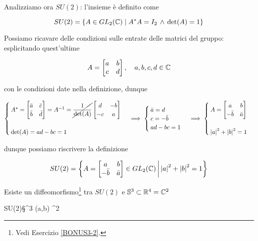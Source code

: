 Analizziamo ora $ SU(2) $: l'insieme è definito come

\begin{equation}
	SU(2) = \{ A \in GL_{2}(\mathbb{C}) \mid A^{*} A = I_{2} \, \wedge \, \det(A) = 1 \}
\end{equation}

Possiamo ricavare delle condizioni sulle entrate delle matrici del gruppo: esplicitando quest'ultime

\begin{equation}
	A = \bmqty{ a & b \\ c & d } \qcomma a,b,c,d \in \C
\end{equation}

con le condizioni date nella definizione, dunque

\begin{equation}
	\begin{cases}
		A^{*} = \bmqty{ \bar{a} & \bar{c} \\ \bar{b} & \bar{d} } %
		= A^{-1} %
		= \cancel{\dfrac{1}{\det(A)}} \bmqty{ d & -b \\ -c & a } \\\\
		\det(A) = a d - b c = 1
	\end{cases}
	\implies %
	\begin{cases}
		\bar{a} = d \\
		c = - \bar{b} \\
		a d - b c = 1
	\end{cases}
	\implies %
	\begin{cases}
		A = \bmqty{ a & b \\ - \bar{b} & \bar{a} } \\\\
		\abs{a}^{2} + \abs{b}^{2} = 1
	\end{cases}
\end{equation}

dunque possiamo riscrivere la definizione

\begin{equation}
	SU(2) = \left\{ A = \bmqty{ a & b \\ - \bar{b} & \bar{a} } \in GL_{2}(\C) \st \abs{a}^{2} + \abs{b}^{2} = 1 \right\}
\end{equation}

Esiste un diffeomorfismo\footnote{%
	Vedi Esercizio \ref{BONUS3-2}.%
} tra $ SU(2) $ e $ \mathbb{S}^{3} \subset \mathbb{R}^{4} = \mathbb{C}^{2} $

\map{\phi}
	{SU(2)}{\S^{3}}
	{}{(a,b) \in \C^{2}}

